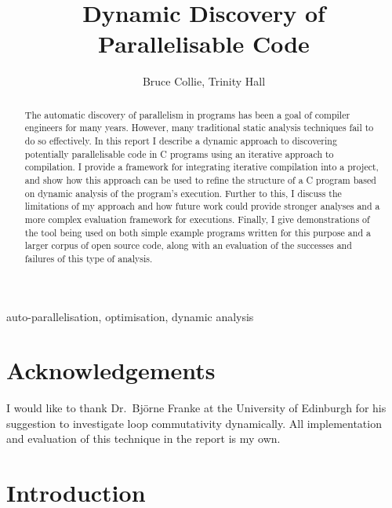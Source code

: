 \documentclass[journal]{IEEEtran}
\begin{document}
\lstset{language=C}
\lstset{
  basicstyle=\footnotesize\ttfamily,
  showstringspaces=false
}

\title{Dynamic Discovery of Parallelisable Code}
\author{Bruce Collie, Trinity Hall}


\maketitle

\begin{abstract}

  The automatic discovery of parallelism in programs has been a goal of compiler
  engineers for many years. However, many traditional static analysis techniques
  fail to do so effectively. In this report I describe a dynamic approach to
  discovering potentially parallelisable code in C programs using an iterative
  approach to compilation. I provide a framework for integrating iterative
  compilation into a project, and show how this approach can be used to refine
  the structure of a C program based on dynamic analysis of the program's
  execution. Further to this, I discuss the limitations of my approach and how
  future work could provide stronger analyses and a more complex evaluation
  framework for executions. Finally, I give demonstrations of the tool being
  used on both simple example programs written for this purpose and a larger
  corpus of open source code, along with an evaluation of the successes and
  failures of this type of analysis.

\end{abstract}

\begin{IEEEkeywords}
auto-parallelisation, optimisation, dynamic analysis
\end{IEEEkeywords}

\IEEEpeerreviewmaketitle

\section*{Acknowledgements}

I would like to thank Dr.\ Bj\"orne Franke at the University of Edinburgh for
his suggestion to investigate loop commutativity dynamically. All implementation
and evaluation of this technique in the report is my own.

\section{Introduction} \label{sec:intro}
\end{document}
